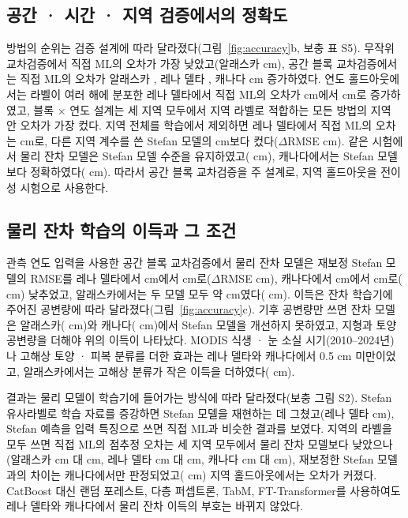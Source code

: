 \subsection{공간 · 시간 · 지역 검증에서의 정확도}
방법의 순위는 검증 설계에 따라 달라졌다(그림~\ref{fig:accuracy}b, 보충 표 S5). 무작위 교차검증에서 직접 ML의 오차가 가장 낮았고(알래스카 \nrmseAkrandDz{} cm), 공간 블록 교차검증에서는 직접 ML의 오차가 알래스카 \noptimAkDz, 레나 델타 \noptimLeDz, 캐나다 \noptimCaDz{} cm 증가하였다. 연도 홀드아웃에서는 라벨이 여러 해에 분포한 레나 델타에서 직접 ML의 오차가 \nrmseLeblkDz{} cm에서 \nrmseLeyrDz{} cm로 증가하였고, 블록 × 연도 설계는 세 지역 모두에서 지역 라벨로 적합하는 모든 방법의 지역 안 오차가 가장 컸다. 지역 전체를 학습에서 제외하면 레나 델타에서 직접 ML의 오차는 \nrmseLeregDz{} cm로, 다른 지역 계수를 쓴 Stefan 모델의 \nrmseLeregPz{} cm보다 컸다($\Delta$RMSE \ndrefLeregDz{} cm). 같은 시험에서 물리 잔차 모델은 Stefan 모델 수준을 유지하였고(\ndrefLeregRo{} cm), 캐나다에서는 Stefan 모델보다 정확하였다(\ndrefCaregRo{} cm). 따라서 공간 블록 교차검증을 주 설계로, 지역 홀드아웃을 전이성 시험으로 사용한다.

\subsection{물리 잔차 학습의 이득과 그 조건}
관측 연도 입력을 사용한 공간 블록 교차검증에서 물리 잔차 모델은 재보정 Stefan 모델의 RMSE를 레나 델타에서 \nrmseLeblkPo{} cm에서 \nrmseLeblkRo{} cm로($\Delta$RMSE \ndrefLeblkRo{} cm), 캐나다에서 \nrmseCablkPo{} cm에서 \nrmseCablkRo{} cm로(\ndrefCablkRo{} cm) 낮추었고, 알래스카에서는 두 모델 모두 약 \nrmseAkblkRo{} cm였다(\ndrefAkblkRo{} cm). 이득은 잔차 학습기에 주어진 공변량에 따라 달라졌다(그림~\ref{fig:accuracy}c). 기후 공변량만 쓰면 잔차 모델은 알래스카(\ndfeatAkFclim{} cm)와 캐나다(\ndfeatCaFclim{} cm)에서 Stefan 모델을 개선하지 못하였고, 지형과 토양 공변량을 더해야 위의 이득이 나타났다. MODIS 식생 · 눈 소실 시기(2010--2024년)나 고해상 토양 · 피복 분류를 더한 효과는 레나 델타와 캐나다에서 0.5 cm 미만이었고, 알래스카에서는 고해상 분류가 작은 이득을 더하였다(\ndfeatAkFhires{} cm).

결과는 물리 모델이 학습기에 들어가는 방식에 따라 달라졌다(보충 그림 S2). Stefan 유사라벨로 학습 자료를 증강하면 Stefan 모델을 재현하는 데 그쳤고(레나 델타 \ndrefLeblkDo{} cm), Stefan 예측을 입력 특징으로 쓰면 직접 ML과 비슷한 결과를 보였다. 지역의 라벨을 모두 쓰면 직접 ML의 점추정 오차는 세 지역 모두에서 물리 잔차 모델보다 낮았으나(알래스카 \nrmseAkblkDz{} cm 대 \nrmseAkblkRo{} cm, 레나 델타 \nrmseLeblkDz{} cm 대 \nrmseLeblkRo{} cm, 캐나다 \nrmseCablkDz{} cm 대 \nrmseCablkRo{} cm), 재보정한 Stefan 모델과의 차이는 캐나다에서만 판정되었고(\ndrefCablkDz{} cm) 지역 홀드아웃에서는 오차가 커졌다. CatBoost 대신 랜덤 포레스트, 다층 퍼셉트론, TabM, FT-Transformer를 사용하여도 레나 델타와 캐나다에서 물리 잔차 이득의 부호는 바뀌지 않았다.

